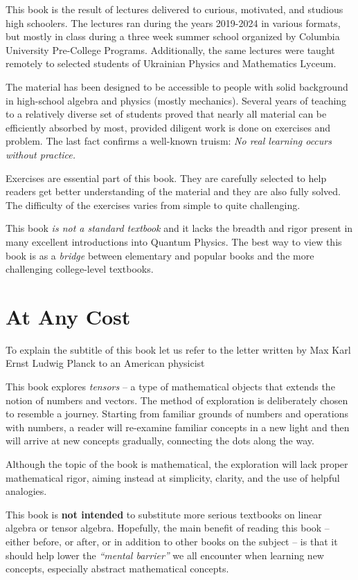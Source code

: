 This book is the result of lectures delivered to curious, motivated, and studious high schoolers. The lectures ran  during the years 2019-2024 in various formats, but mostly in class during a three week summer school organized by Columbia University Pre-College Programs. Additionally, the same lectures were taught remotely to selected students of Ukrainian Physics and Mathematics Lyceum. 

The material has been designed to be accessible to people with solid background in high-school algebra and physics (mostly mechanics). Several years of teaching to a relatively diverse set of students proved that nearly all material can be efficiently absorbed by most, provided diligent work is done on exercises and problem. The last fact confirms a well-known truism: \emph{No real learning occurs without practice.}

Exercises are essential part of this book.  They are carefully selected to help readers get better understanding of the material and they are also fully solved. The difficulty of the exercises varies from simple to quite challenging.

This book \emph{is not a standard textbook} and it lacks the breadth and rigor present in many excellent introductions into Quantum Physics. The best way to view this book is as a \emph{bridge} between  elementary and popular books and the more challenging college-level textbooks. 

\section*{At Any Cost}
To explain the subtitle of this book let us refer to the letter written by Max Karl Ernst Ludwig Planck to an American physicist

This book explores \emph{tensors} -- a type of mathematical objects
that extends the notion of numbers and vectors. The method of
exploration is deliberately chosen to resemble a journey. Starting
from familiar grounds of numbers and operations with numbers, a reader
will re-examine familiar concepts in a new light and then will arrive
at new concepts gradually, connecting the dots along the way.

Although the topic of the book is mathematical, the exploration will
lack proper mathematical rigor, aiming instead at simplicity, clarity,
and the use of helpful analogies.

This book is {\bf not intended} to substitute more serious textbooks on linear
algebra or tensor algebra. Hopefully, the main benefit of
reading this book -- either before, or after, or in addition to other
books on the subject -- is that it should help lower the
\emph{``mental barrier''} we all encounter when
learning new concepts, especially abstract mathematical concepts.

